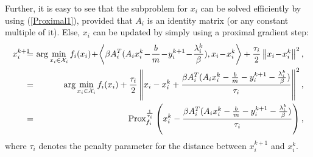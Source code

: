 \documentclass{mcom-l}
\theoremstyle{definition}
\theoremstyle{remark}
\numberwithin{equation}{section}
\begin{document}
Further, it is easy to see that the subproblem for $x_i$ can be solved efficiently by using (\ref{Proximal1}), provided that $A_i$ is an identity matrix (or any constant multiple of it). Else, $x_i$ can be updated by simply using a proximal gradient step:
\begin{eqnarray}\label{xLinearAlg2}
x_i^{k+1} \!\!\!\!&=&\!\!\!\! \arg\min\limits_{x_i\in {\mathcal{X}}_i} f_i (x_i) \!+\! \left\langle \beta A_i^T( A_i x_i^k \!-\! \frac{b}{m} \!-\! y_i^{k+1} \!-\! \frac{\lambda_i^k}{\beta}), x_i \!-\! x_i^k \right\rangle + \frac{\tau_i}{2}\left\| x_i \!-\! x_i^k \right\|^2,\nonumber\\
\!\!\!\!&=&\!\!\!\! \arg\min\limits_{x_i\in {\mathcal{X}}_i} f_i (x_i) + \frac{\tau_i}{2}\left\| x_i - x_i^k + \frac{\beta A_i^T( A_i x_i^k - \frac{b}{m} - y_i^{k+1}  - \frac{\lambda_i^k}{\beta})}{\tau_i} \right\|^2,\nonumber\\
\!\!\!\!&=&\!\!\!\! \hbox{Prox}_{f_i}^{\frac{1}{\tau_i}} \left(x_i^k - \frac{\beta A_i^T( A_i x_i^k - \frac{b}{m} - y_i^{k+1}  - \frac{\lambda_i^k}{\beta})}{\tau_i}\right),
\end{eqnarray}
where $\tau_i$ denotes the penalty parameter for the distance between $x_i^{k+1}$ and $x_i^k$.
\end{document}
